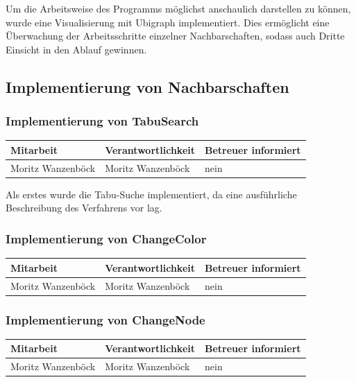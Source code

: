 Um die Arbeitsweise des Programms möglichst anschaulich darstellen zu können, wurde eine Visualisierung mit Ubigraph implementiert. Dies ermöglicht eine Überwachung der Arbeitsschritte einzelner Nachbarschaften, sodass auch Dritte Einsicht in den Ablauf gewinnen.

\subsection{Implementierung von Nachbarschaften}

\subsubsection{Implementierung von TabuSearch}

\begin{center}
\begin{tabular}{lll}
	Mitarbeit & Verantwortlichkeit & Betreuer informiert \\
	\hline
	Moritz Wanzenböck & Moritz Wanzenböck & nein \\
\end{tabular}
\end{center}

Als erstes wurde die Tabu-Suche implementiert, da eine ausführliche Beschreibung des Verfahrens vor lag. %

\subsubsection{Implementierung von ChangeColor} %

\begin{center}
\begin{tabular}{lll}
	Mitarbeit & Verantwortlichkeit & Betreuer informiert \\
	\hline
	Moritz Wanzenböck & Moritz Wanzenböck & nein \\
\end{tabular}
\end{center}

\subsubsection{Implementierung von ChangeNode} %

\begin{center}
\begin{tabular}{lll}
	Mitarbeit & Verantwortlichkeit & Betreuer informiert \\
	\hline
	Moritz Wanzenböck & Moritz Wanzenböck & nein \\
\end{tabular}
\end{center}


